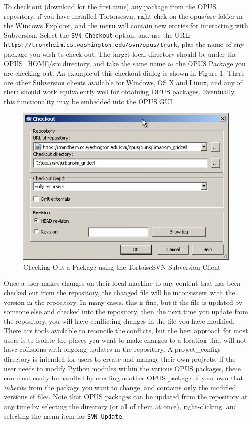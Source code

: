 To check out (download for the first time) any package from the OPUS repository, if you have installed Tortoisesvn, right-click on the opus/src folder in the Windows Explorer, and the menu will contain new entries for interacting with Subversion.  Select the \verb#SVN Checkout# option, and use the URL: \verb#https://trondheim.cs.washington.edu/svn/opus/trunk#, plus the name of any package you wish to check out.  The target local directory should be under the OPUS\_HOME/src directory, and take the same name as the OPUS Package you are checking out.  An example of this checkout dialog is shown in Figure \ref{fig:tortoisesvn}.  There are other Subversion clients available for Windows, OS X and Linux, and any of them should work equivalently well for obtaining OPUS packages.  Eventually, this functionality may be embedded into the OPUS GUI.

\begin{figure}[htp]
\begin{center}
\includegraphics[scale=0.4]{graphics/tortoisesvn.png}
\end{center}
\caption{Checking Out a Package using the TortoiseSVN Subversion Client}
\label{fig:tortoisesvn}
\end{figure}

Once a user makes changes on their local machine to any content that has been checked out from the repository, the changed file will be inconsistent with the version in the repository.  In many cases, this is fine, but if the file is updated by someone else and checked into the repository, then the next time you update from the repository, you will have conflicting changes in the file you have modified.  There are tools available to reconcile the conflicts, but the best approach for most users is to isolate the places you want to make changes to a location that will not have collisions with ongoing updates in the repository.  A project\_configs directory is intended for users to create and manage their own projects.  If the user needs to modify Python modules within the various OPUS packages, these can most easily be handled by creating another OPUS package of your own that \emph{inherits} from the package you want to change, and contains only the modified versions of files.   Note that OPUS packages can be updated from the repository at any time by selecting the directory (or all of them at once), right-clicking, and selecting the menu item for \verb#SVN Update#.

